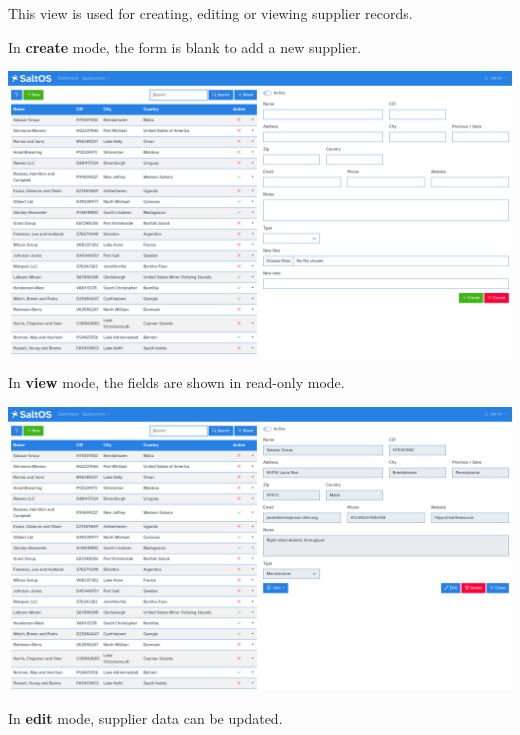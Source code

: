 \documentclass[a4paper]{article}
\begin{document}
This view is used for creating, editing or viewing supplier records.

In \textbf{create} mode, the form is blank to add a new supplier.

\begin{center}\includegraphics[width=1\textwidth]{../ujest/snaps/test-screenshots-js-screenshots-purchases-suppliers-create-en-us-1-snap.png}\end{center}

In \textbf{view} mode, the fields are shown in read-only mode.

\begin{center}\includegraphics[width=1\textwidth]{../ujest/snaps/test-screenshots-js-screenshots-purchases-suppliers-view-100-en-us-1-snap.png}\end{center}

In \textbf{edit} mode, supplier data can be updated.
\end{document}

